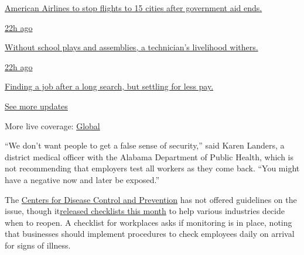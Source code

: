 \href{https://www.nytimes3xbfgragh.onion/live/2020/08/20/business/stock-market-today-coronavirus?action=click\&pgtype=Article\&state=default\&region=MAIN_CONTENT_1\&context=storylines_live_updates\#american-airlines-to-stop-flights-to-15-cities-after-government-aid-ends}{American
Airlines to stop flights to 15 cities after government aid ends.}

\href{https://www.nytimes3xbfgragh.onion/live/2020/08/20/business/stock-market-today-coronavirus?action=click\&pgtype=Article\&state=default\&region=MAIN_CONTENT_1\&context=storylines_live_updates\#without-school-plays-and-assemblies-a-technicians-livelihood-withers}{22h
ago}

\href{https://www.nytimes3xbfgragh.onion/live/2020/08/20/business/stock-market-today-coronavirus?action=click\&pgtype=Article\&state=default\&region=MAIN_CONTENT_1\&context=storylines_live_updates\#without-school-plays-and-assemblies-a-technicians-livelihood-withers}{Without
school plays and assemblies, a technician's livelihood withers.}

\href{https://www.nytimes3xbfgragh.onion/live/2020/08/20/business/stock-market-today-coronavirus?action=click\&pgtype=Article\&state=default\&region=MAIN_CONTENT_1\&context=storylines_live_updates\#finding-a-job-after-a-long-search-but-settling-for-less-pay}{22h
ago}

\href{https://www.nytimes3xbfgragh.onion/live/2020/08/20/business/stock-market-today-coronavirus?action=click\&pgtype=Article\&state=default\&region=MAIN_CONTENT_1\&context=storylines_live_updates\#finding-a-job-after-a-long-search-but-settling-for-less-pay}{Finding
a job after a long search, but settling for less pay.}

\href{https://www.nytimes3xbfgragh.onion/live/2020/08/20/business/stock-market-today-coronavirus?action=click\&pgtype=Article\&state=default\&region=MAIN_CONTENT_1\&context=storylines_live_updates}{See
more updates}

More live coverage:
\href{https://www.nytimes3xbfgragh.onion/2020/08/21/world/covid-19-coronavirus.html?action=click\&pgtype=Article\&state=default\&region=MAIN_CONTENT_1\&context=storylines_live_updates}{Global}

``We don't want people to get a false sense of security,'' said Karen
Landers, a district medical officer with the Alabama Department of
Public Health, which is not recommending that employers test all workers
as they come back. ``You might have a negative now and later be
exposed.''

The
\href{https://www.nytimes3xbfgragh.onion/2020/05/22/health/Coronavirus-touching-surfaces.html}{Centers
for Disease Control and Prevention} has not offered guidelines on the
issue, though
it\href{https://www.nytimes3xbfgragh.onion/2020/05/15/us/cdc-coronavirus-checklists-decision-trees.html}{released
checklists this month} to help various industries decide when to reopen.
A checklist for workplaces asks if monitoring is in place, noting that
businesses should implement procedures to check employees daily on
arrival for signs of illness.

